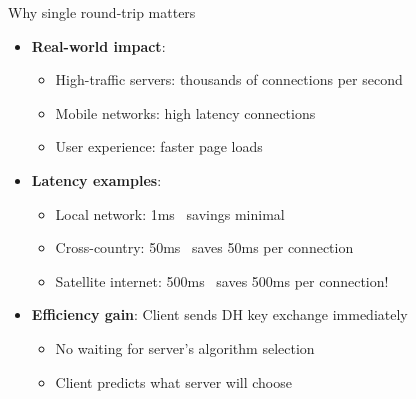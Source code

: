 \documentclass[aspectratio=169, lualatex, handout]{beamer}
\begin{document}
\begin{frame}{Why single round-trip matters}
	\begin{itemize}[<+->]
		\item \textbf{Real-world impact}:
		      \begin{itemize}
			      \item High-traffic servers: thousands of connections per second
			      \item Mobile networks: high latency connections
			      \item User experience: faster page loads
		      \end{itemize}
		\item \textbf{Latency examples}:
		      \begin{itemize}
			      \item Local network: 1ms \rightarrow\ savings minimal
			      \item Cross-country: 50ms \rightarrow\ saves 50ms per connection
			      \item Satellite internet: 500ms \rightarrow\ saves 500ms per connection!
		      \end{itemize}
		\item \textbf{Efficiency gain}: Client sends DH key exchange immediately
		      \begin{itemize}
			      \item No waiting for server's algorithm selection
			      \item Client predicts what server will choose
		      \end{itemize}
	\end{itemize}
\end{frame}
\end{document}
